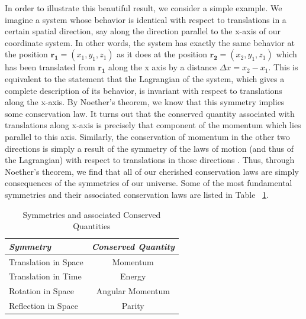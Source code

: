 \documentclass[a4paper,12pt]{book}
\begin{document}
In order to illustrate this beautiful result, we consider a simple example. We imagine a system whose behavior is identical with respect to translations in a certain spatial direction, say along the direction parallel to the x-axis of our coordinate system. In other words, the system has exactly the same behavior at the position $\mathbf{r_{1}}=(x_{1},y_{1},z_{1})$ as it does at the position $\mathbf{r_{2}}=(x_{2},y_{1},z_{1})$ which has been translated from $\mathbf{r_{1}}$ along the x axis by a distance $\Delta x=x_{2}-x_{1}$. This is equivalent to the statement that the Lagrangian of the system, which gives a complete description of its behavior, is invariant with respect to translations along the x-axis. By Noether's theorem, we know that this symmetry implies some conservation law. It turns out that the conserved quantity associated with translations along x-axis is precisely that component of the momentum which lies parallel to this axis. Similarly, the conservation of momentum in the other two directions is simply a result of the symmetry of the laws of motion (and thus of the Lagrangian) with respect to translations in those directions \cite{Schumm}. Thus, through Noether's theorem, we find that all of our cherished conservation laws are simply consequences of the symmetries of our universe. Some of the most fundamental symmetries and their associated conservation laws are listed in Table ~\ref{sym_cons}.
\begin{table}[symmetries]
\caption{Symmetries and associated Conserved Quantities} %
\label{sym_cons}
\centering                           %
\begin{tabular}{l c}              %
\\ \hline \hline                             %
 \emph{Symmetry} &\emph{Conserved Quantity}
\\ [0.5ex]
\hline                                      %
Translation in Space & Momentum \\
Translation in Time & Energy \\
Rotation in Space & Angular Momentum \\
Reflection in Space & Parity \\
 
\hline
\end{tabular}
\end{table}
\end{document}
